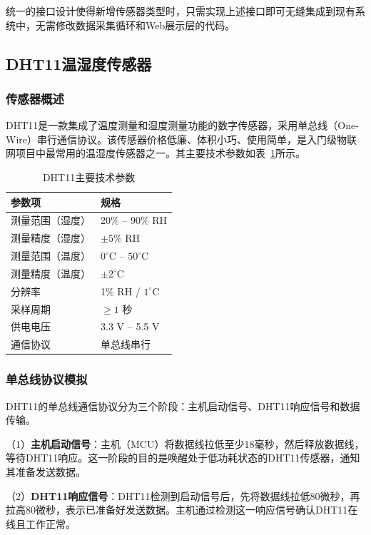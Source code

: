 \documentclass[12pt,a4paper]{ctexart}
\begin{document}
统一的接口设计使得新增传感器类型时，只需实现上述接口即可无缝集成到现有系统中，无需修改数据采集循环和Web展示层的代码。

\subsection{DHT11温湿度传感器}

\subsubsection{传感器概述}

DHT11是一款集成了温度测量和湿度测量功能的数字传感器，采用单总线（One-Wire）串行通信协议。该传感器价格低廉、体积小巧、使用简单，是入门级物联网项目中最常用的温湿度传感器之一。其主要技术参数如表~\ref{tab:dht11}所示。

\begin{table}[H]
    \centering
    \caption{DHT11主要技术参数}
    \label{tab:dht11}
    \begin{tabular}{@{}ll@{}}
        \toprule
        \textbf{参数项} & \textbf{规格} \\
        \midrule
        测量范围（湿度） & 20\% -- 90\% RH \\
        测量精度（湿度） & $\pm 5\%$ RH \\
        测量范围（温度） & $0^\circ$C -- $50^\circ$C \\
        测量精度（温度） & $\pm 2^\circ$C \\
        分辨率 & 1\% RH / $1^\circ$C \\
        采样周期 & $\geq 1$ 秒 \\
        供电电压 & 3.3 V -- 5.5 V \\
        通信协议 & 单总线串行 \\
        \bottomrule
    \end{tabular}
\end{table}

\subsubsection{单总线协议模拟}

DHT11的单总线通信协议分为三个阶段：主机启动信号、DHT11响应信号和数据传输。

（1）\textbf{主机启动信号}：主机（MCU）将数据线拉低至少18毫秒，然后释放数据线，等待DHT11响应。这一阶段的目的是唤醒处于低功耗状态的DHT11传感器，通知其准备发送数据。

（2）\textbf{DHT11响应信号}：DHT11检测到启动信号后，先将数据线拉低80微秒，再拉高80微秒，表示已准备好发送数据。主机通过检测这一响应信号确认DHT11在线且工作正常。
\end{document}

